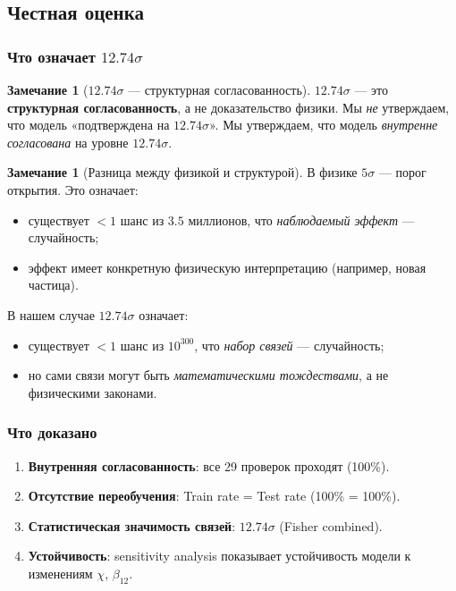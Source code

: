 \documentclass[11pt,a4paper]{article}
\theoremstyle{definition}
\newtheorem{remark}[theorem]{Замечание}
\begin{document}
\subsection{Честная оценка}
\label{subsec:cv-honest}

\subsubsection{Что означает \texorpdfstring{$12.74\sigma$}{12.74}}

\begin{remark}[$12.74\sigma$ — структурная согласованность]
\label{rem:sigma-structural}
$12.74\sigma$ — это \textbf{структурная согласованность},
а не доказательство физики. Мы \emph{не} утверждаем, что
модель «подтверждена на $12.74\sigma$». Мы утверждаем,
что модель \emph{внутренне согласована} на уровне $12.74\sigma$.
\end{remark}

\begin{remark}[Разница между физикой и структурой]
\label{rem:physics-vs-structure}
В физике $5\sigma$ — порог открытия. Это означает:
\begin{itemize}
    \item существует $< 1$ шанс из $3.5$ миллионов, что
          \emph{наблюдаемый эффект} — случайность;
    \item эффект имеет конкретную физическую интерпретацию
          (например, новая частица).
\end{itemize}
В нашем случае $12.74\sigma$ означает:
\begin{itemize}
    \item существует $< 1$ шанс из $10^{300}$, что
          \emph{набор связей} — случайность;
    \item но сами связи могут быть \emph{математическими
          тождествами}, а не физическими законами.
\end{itemize}
\end{remark}

\subsubsection{Что доказано}

\begin{enumerate}
    \item \textbf{Внутренняя согласованность}: все 29 проверок
          проходят (100\%).
    \item \textbf{Отсутствие переобучения}: Train rate = Test rate
          (100\% = 100\%).
    \item \textbf{Статистическая значимость связей}:
          $12.74\sigma$ (Fisher combined).
    \item \textbf{Устойчивость}: sensitivity analysis показывает
          устойчивость модели к изменениям $\chi$, $\beta_{12}$.
\end{enumerate}
\end{document}
